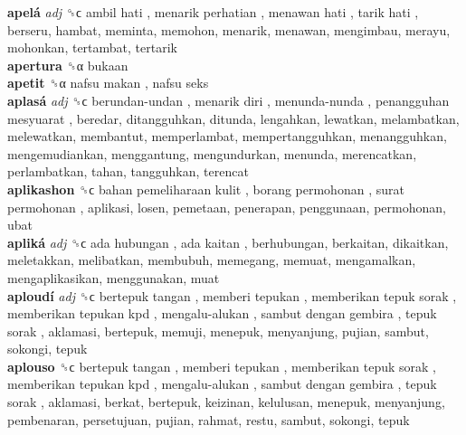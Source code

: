 \textbf{apelá} \emph{adj}  ␝ϲ   ambil hati ,  menarik perhatian ,  menawan hati ,  tarik hati , berseru, hambat, meminta, memohon, menarik, menawan, mengimbau, merayu, mohonkan, tertambat, tertarik  \\
\textbf{apertura} ␝α  bukaan  \\
\textbf{apetit} ␝α   nafsu makan ,  nafsu seks   \\
\textbf{aplasá} \emph{adj}  ␝ϲ   berundan-undan ,  menarik diri ,  menunda-nunda ,  penangguhan mesyuarat , beredar, ditangguhkan, ditunda, lengahkan, lewatkan, melambatkan, melewatkan, membantut, memperlambat, mempertangguhkan, menangguhkan, mengemudiankan, menggantung, mengundurkan, menunda, merencatkan, perlambatkan, tahan, tangguhkan, terencat  \\
\textbf{aplikashon} ␝ϲ   bahan pemeliharaan kulit ,  borang permohonan ,  surat permohonan , aplikasi, losen, pemetaan, penerapan, penggunaan, permohonan, ubat  \\
\textbf{apliká} \emph{adj}  ␝ϲ   ada hubungan ,  ada kaitan , berhubungan, berkaitan, dikaitkan, meletakkan, melibatkan, membubuh, memegang, memuat, mengamalkan, mengaplikasikan, menggunakan, muat  \\
\textbf{aploudí} \emph{adj}  ␝ϲ   bertepuk tangan ,  memberi tepukan ,  memberikan tepuk sorak ,  memberikan tepukan kpd ,  mengalu-alukan ,  sambut dengan gembira ,  tepuk sorak , aklamasi, bertepuk, memuji, menepuk, menyanjung, pujian, sambut, sokongi, tepuk  \\
\textbf{aplouso} ␝ϲ   bertepuk tangan ,  memberi tepukan ,  memberikan tepuk sorak ,  memberikan tepukan kpd ,  mengalu-alukan ,  sambut dengan gembira ,  tepuk sorak , aklamasi, berkat, bertepuk, keizinan, kelulusan, menepuk, menyanjung, pembenaran, persetujuan, pujian, rahmat, restu, sambut, sokongi, tepuk  \\
